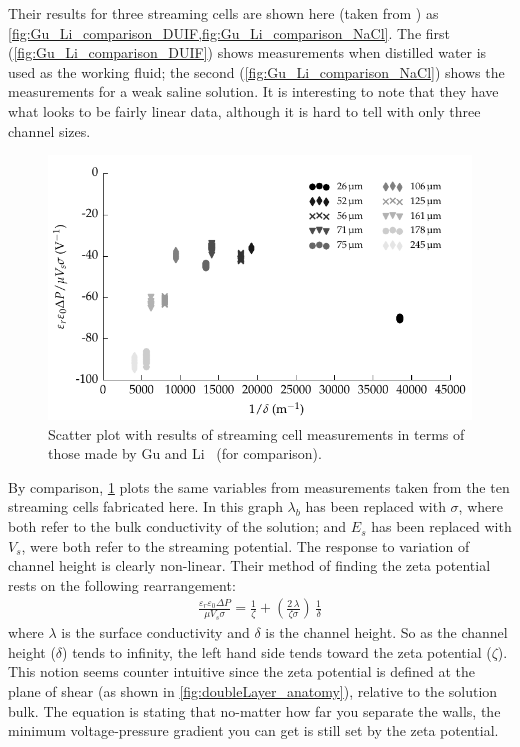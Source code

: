   Their results for three streaming cells are shown here (taken from \cite{Gu2000}) as \cref{fig:Gu_Li_comparison_DUIF,fig:Gu_Li_comparison_NaCl}.
  The first (\cref{fig:Gu_Li_comparison_DUIF}) shows measurements when distilled water is used as the working fluid; the second (\cref{fig:Gu_Li_comparison_NaCl}) shows the measurements for a weak saline solution.
  It is interesting to note that they have what looks to be fairly linear data, although it is hard to tell with only three channel sizes.

  \begin{figure}
      \centering
      \includegraphics{content/pt1/01-PowerHarvesting/graphics/graph_streamingComparison_gu}
      \caption{\label{fig:streamingCell_scatter_Gu_Li}Scatter plot with results of streaming cell measurements in terms of those made by Gu and Li~\cite{Gu2000} (for comparison).}
  \end{figure}

  By comparison, \cref{fig:streamingCell_scatter_Gu_Li} plots the same variables from measurements taken from the ten streaming cells fabricated here.
  In this graph $\lambda_{b}$ has been replaced with $\sigma$, where both refer to the bulk conductivity of the solution; and $E_{s}$ has been replaced with $V_{s}$, were both refer to the streaming potential.
  The response to variation of channel height is clearly non-linear.
  Their method of finding the zeta potential rests on the following rearrangement:
  \begin{eqnarray}
      \frac{\varepsilon_{r}\varepsilon_{0}\Delta P}{\mu V_{s}\sigma} = \frac{1}{\zeta} + \left( \frac{2\,\lambda}{\zeta \sigma}\right)\,\frac{1}{\delta}
  \end{eqnarray}
  where $\lambda$ is the surface conductivity and $\delta$ is the channel height.
  So as the channel height ($\delta$) tends to infinity, the left hand side tends toward the zeta potential ($\zeta$).
  This notion seems counter intuitive since the zeta potential is defined at the plane of shear (as shown in \cref{fig:doubleLayer_anatomy}), relative to the solution bulk.
  The equation is stating that no-matter how far you separate the walls, the minimum voltage-pressure gradient you can get is still set by the zeta potential.

